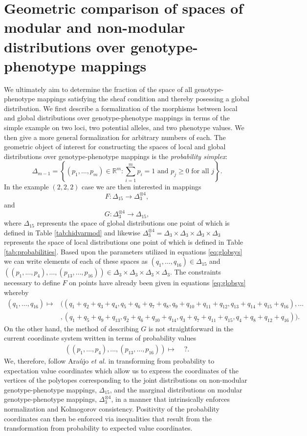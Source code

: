 \documentclass[10pt]{article}
\begin{document}
\section*{Geometric comparison of spaces of modular and non-modular distributions over genotype-phenotype mappings}
We ultimately aim to determine the fraction of the space of all genotype-phenotype mappings satisfying the sheaf condition and thereby posessing a global distribution. We first describe a formalization of the morphisms between local and global distributions over genotype-phenotype mappings in terms of the simple example on two loci, two potential alleles, and two phenotype values. We then give a more general formalization for arbitrary numbers of each. The geometric object of interest for constructing the spaces of local and global distributions over genotype-phenotype mappings is the \emph{probability simplex}:
$$
\Delta_{m-1} = \left\{ (p_1, \ldots , p_m) \in \mathbb{R}^m \colon \sum_{i=1}^m p_i = 1 \text{ and } p_j \geq 0 \text{ for all } j \right\}.
$$
In the example $(2,2,2)$ case we are then interested in mappings
$$
F \colon \Delta_{15} \longrightarrow \Delta_3^{\otimes 4},
$$
and
$$
G \colon	 \Delta_3^{\otimes 4} \longrightarrow \Delta_{15},
$$
where $\Delta_{15}$ represents the space of global distributions one point of which is defined in Table \ref{tab:hidvarmod} and likewise $\Delta_3^{\otimes 4} = \Delta_3 \times \Delta_3 \times \Delta_3 \times \Delta_3$ represents the space of local distributions one point of which is defined in Table \ref{tab:probabilities}. Based upon the parameters utilized in equations \ref{eq:globsys} we can write elements of each of these spaces as $(q_1, \ldots, q_{16}) \in \Delta_{15}$ and $((p_1, \ldots , p_4), \ldots, (p_{13},\ldots,p_{16})) \in \Delta_3 \times \Delta_3 \times \Delta_3 \times \Delta_3$. The constraints necessary to define $F$ on points have already been given in equations \ref{eq:globsys} whereby
\begin{align*}
(q_1, \ldots , q_{16}) \mapsto &((q_1+q_2+q_3+q_4, q_5+q_6+q_7+q_8, q_9+q_{10}+q_{11}+q_{12},q_{13}+q_{14}+q_{15}+q_{16}), \ldots \\
&,(q_1 + q_5 + q_9 + q_{13}, q_2 + q_6 + q_{10} + q_{14}, q_3 + q_7 + q_{11} + q_{15}, q_4 + q_8 + q_{12} + q_{16} ) ).
\end{align*}
On the other hand, the method of describing $G$ is not straightforward in the current coordinate system written in terms of probability values
\begin{align*}
((p_1, \ldots , p_4), \ldots, (p_{13},\ldots,p_{16})) \mapsto & \,\,?.
\end{align*}
We, therefore, follow Ara\'{u}jo {\it et al.} \cite{Araujo2012} in transforming from probability to expectation value coordinates which allow us to express the coordinates of the vertices of the polytopes corresponding to the joint distributions on non-modular genotype-phenotype mappings, $\Delta_{15}$, and the marginal distributions on modular genotype-phenotype mappings, $\Delta_3^{\otimes 4}$, in a manner that intrinsically enforces normalization and Kolmogorov consistency. Positivity of the probability coordinates can then be enforced via inequalities that result from the transformation from probability to expected value coordinates.
\end{document}
